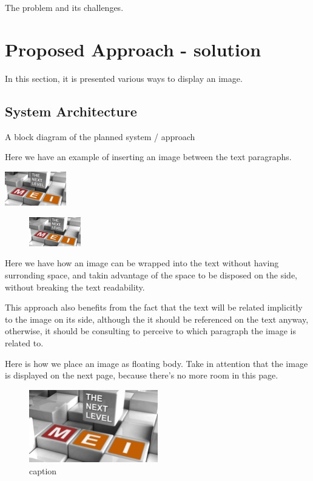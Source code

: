 \iffalse

	         The problem and its challenges.

	\section{Proposed Approach - solution}
	In this section, it is presented various ways to display an image.
     \subsection{System Architecture}
     A block diagram of the planned system / approach

	Here we have an example of inserting an image between the text paragraphs.
	\begin{center}
		\includegraphics[width=0.2\textwidth]{img/mei-logo-03.jpg}
	\end{center}

	\begin{figure}	
		\includegraphics[width=0.2\textwidth]{img/mei-logo-03.jpg}
	\end{figure}
	Here we have how an image can be wrapped into the text without having surronding space, and takin advantage of the space to be disposed on the side, without breaking the text readability.

	This approach also benefits from the fact that the text will be related implicitly to the image on its side, although the it should be referenced on the text anyway, otherwise, it should be consulting to perceive to which paragraph the image is related to.

	Here is how we place an image as floating body.
	Take in attention that the image is displayed on the next page, because there's no more room in this page.
	\begin{figure}
	\begin{center}
		\includegraphics[width=0.5\textwidth]{img/mei-logo-03.jpg}
	\end{center}
	\caption{caption}
	\end{figure}



